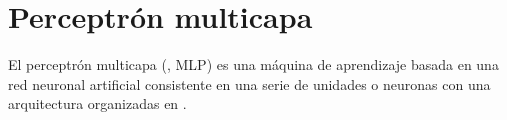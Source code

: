 %
%
%
\section{Perceptrón multicapa}
%




El perceptrón multicapa (, MLP)
\cite{mlp2,mlp1} es una máquina de aprendizaje basada en una red
neuronal artificial consistente en una serie de {unidades} o neuronas
con una arquitectura organizadas en .




